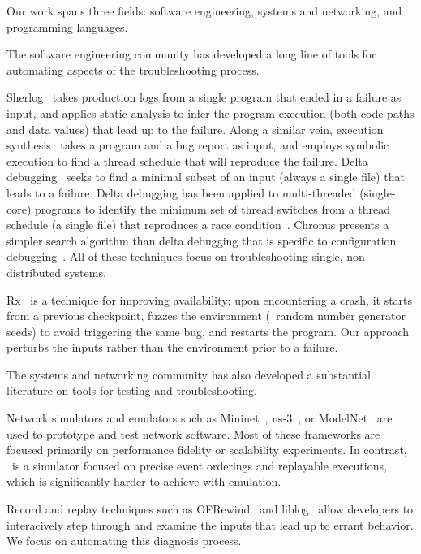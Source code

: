 Our work spans three fields: software engineering, systems and networking, and
programming languages.

The software engineering community has developed a long line of tools for automating
aspects of the troubleshooting process.

Sherlog~\cite{Yuan:2010:SED:1736020.1736038} takes production logs from a
single program that ended in a failure as input, and applies static analysis to infer the
program execution (both code paths and data values) that lead up to the failure.
Along a similar vein, execution
synthesis~\cite{Zamfir:2010:EST:1755913.1755946} takes a program and a bug
report as input, and employs symbolic execution to find a thread schedule that will
reproduce the failure. Delta
debugging~\cite{Zeller:2002:SIF:506201.506206} seeks to find a minimal
subset of an input (always a single file) that leads to a failure. Delta debugging
has been applied to multi-threaded (single-core) programs
to identify the minimum set of thread
switches from a thread schedule (a single file) that reproduces
a race condition~\cite{choi2002isolating}. Chronus presents a simpler search
algorithm than delta debugging that is specific to configuration
debugging~\cite{whitaker2004configuration}.
All of these techniques focus on troubleshooting single, non-distributed
systems.

Rx~\cite{qin2005rx} is a technique for improving availability: upon
encountering a crash, it starts from a previous checkpoint, fuzzes
the environment (\eg~random number generator seeds) to avoid triggering the same bug,
and restarts the program. Our
approach perturbs the inputs rather than the environment
prior to a failure.

The systems and networking community has also developed a substantial
literature on tools for testing and troubleshooting.

Network simulators and emulators such as
Mininet~\cite{handigol2012reproducible}, ns-3~\cite{ns3}, or ModelNet~\cite{Vahdat:2002:SAL:844128.844154}
are used to prototype and test network software. Most of these frameworks are focused
primarily on performance fidelity or scalability experiments. In contrast, \projectname~is a simulator focused on
precise event orderings and replayable executions, which is significantly harder to achieve with
emulation.

Record and replay techniques such as OFRewind~\cite{ofrewind} and
liblog~\cite{Geels:2006:RDD:1267359.1267386} allow developers
to interacively step through and examine the inputs that lead up to errant behavior.
We focus on automating this diagnosis process.


